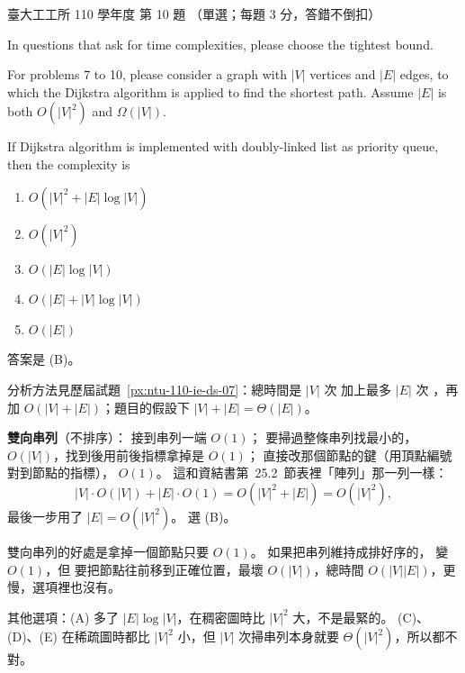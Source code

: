 \begin{pastexam}[label={px:ntu-110-ie-ds-10}]{臺大工工所 110 學年度 第 10 題}
（單選；每題 3 分，答錯不倒扣）

In questions that ask for time complexities, please choose the tightest bound.

For problems 7 to 10, please consider a graph with $|V|$ vertices and $|E|$ edges, to which the Dijkstra
algorithm is applied to find the shortest path. Assume $|E|$ is both $O(|V|^2)$ and $\Omega(|V|)$.

If Dijkstra algorithm is implemented with doubly-linked list as priority queue, then the complexity is

\begin{enumerate}[label=(\Alph*)]
\item $O(|V|^2+|E|\log|V|)$
\item $O(|V|^2)$
\item $O(|E|\log|V|)$
\item $O(|E|+|V|\log|V|)$
\item $O(|E|)$
\end{enumerate}
\end{pastexam}

\begin{pastsoln}
答案是 (B)。

分析方法見歷屆試題~\ref{px:ntu-110-ie-ds-07}：總時間是 $|V|$ 次  加上最多 $|E|$ 次 ，再加 $O(|V| + |E|)$；題目的假設下 $|V| + |E| = \Theta(|E|)$。

\textbf{雙向串列}（不排序）： 接到串列一端 $O(1)$； 要掃過整條串列找最小的，
$O(|V|)$，找到後用前後指標拿掉是 $O(1)$； 直接改那個節點的鍵（用頂點編號對到節點的指標），
$O(1)$。 這和資結書第~25.2~節表裡「陣列」那一列一樣：
\[
  |V| \cdot O(|V|) + |E| \cdot O(1) = O(|V|^2 + |E|) = O(|V|^2) ,
\]
最後一步用了 $|E| = O(|V|^2)$。 選 (B)。

雙向串列的好處是拿掉一個節點只要 $O(1)$。 如果把串列維持成排好序的， 變 $O(1)$，但
 要把節點往前移到正確位置，最壞 $O(|V|)$，總時間 $O(|V||E|)$，更慢，選項裡也沒有。

其他選項：(A) 多了 $|E|\log|V|$，在稠密圖時比 $|V|^2$ 大，不是最緊的。 (C)、(D)、(E) 在稀疏圖時都比
$|V|^2$ 小，但 $|V|$ 次掃串列本身就要 $\Theta(|V|^2)$，所以都不對。
\end{pastsoln}
